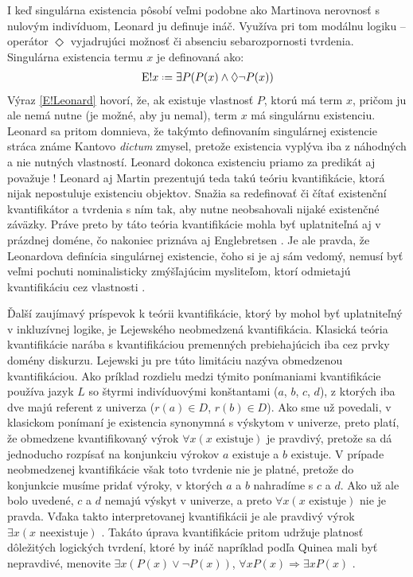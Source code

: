 \documentclass[12pt, letterpaper]{article}
\newcommand*{\defeq}{\mathrel{\vcenter{\baselineskip0.5ex \lineskiplimit0pt
                     \hbox{\scriptsize.}\hbox{\scriptsize.}}}%
                     =}
\begin{document}
I keď singulárna existencia pôsobí veľmi podobne ako Martinova nerovnosť s nulovým indivíduom, Leonard ju definuje ináč. Využíva pri tom modálnu logiku -- operátor $\Diamond$ vyjadrujúci možnosť či absenciu sebarozpornosti tvrdenia. Singulárna existencia termu $x$ je definovaná ako:
\begin{alignat}{3}
		\text{E}!x \defeq \exists P (P(x) \land \Diamond \neg P(x)) \label{E!Leonard}
\end{alignat}	
Výraz \ref{E!Leonard} hovorí, že, ak existuje vlastnosť $P$, ktorú má term $x$, pričom ju ale nemá nutne (je možné, aby ju nemal), term $x$ má singulárnu existenciu. Leonard sa pritom domnieva, že takýmto definovaním singulárnej existencie stráca známe Kantovo \textit{dictum}  zmysel, pretože existencia vyplýva iba z náhodných a nie nutných vlastností. Leonard dokonca existenciu priamo za predikát aj považuje \parencites[58]{leonard}! Leonard aj Martin prezentujú teda takú teóriu kvantifikácie, ktorá nijak nepostuluje existenciu objektov. Snažia sa redefinovať či čítať existenční kvantifikátor a tvrdenia s ním tak, aby nutne neobsahovali nijaké existenčné záväzky. Práve preto by táto teória kvantifikácie mohla byť uplatniteľná aj v prázdnej doméne, čo nakoniec priznáva aj Englebretsen \parencites[352]{englebretsen}. Je ale pravda, že Leonardova definícia singulárnej existencie, čoho si je aj sám vedomý, nemusí byť veľmi pochuti nominalisticky zmýšľajúcim mysliteľom, ktorí odmietajú kvantifikáciu cez vlastnosti \parencites[56]{leonard}.\par 
Ďalší zaujímavý príspevok k teórii kvantifikácie, ktorý by mohol byť uplatniteľný v inkluzívnej logike, je Lejewského neobmedzená kvantifikácia. Klasická teória kvantifikácie narába s kvantifikáciou premenných prebiehajúcich iba cez prvky domény diskurzu. Lejewski ju pre túto limitáciu nazýva obmedzenou kvantifikáciou. Ako príklad rozdielu medzi týmito ponímaniami kvantifikácie používa jazyk $L$ so štyrmi indivíduovými konštantami ($a$, $b$, $c$, $d$), z ktorých iba dve majú referent z univerza ($r(a) \in D$, $r(b) \in D$). Ako sme už povedali, v klasickom ponímaní je existencia synonymná s výskytom v univerze, preto platí, že obmedzene kvantifikovaný výrok $\forall x (x \text{ existuje})$ je pravdivý, pretože sa dá jednoducho rozpísať na konjunkciu výrokov $a \text{ existuje}$ a $b \text{ existuje}$. V prípade neobmedzenej kvantifikácie však toto tvrdenie nie je platné, pretože do konjunkcie musíme pridať výroky, v ktorých $a$ a $b$ nahradíme s $c$ a $d$. Ako už ale bolo uvedené, $c$ a $d$ nemajú výskyt v univerze, a preto $\forall x (x \text{ existuje})$ nie je pravda. Vďaka takto interpretovanej kvantifikácii je ale pravdivý výrok $\exists x (x \text{ neexistuje})$ \parencites[108--110]{lejewski}. Takáto úprava kvantifikácie pritom udržuje platnosť dôležitých logických tvrdení, ktoré by ináč napríklad podľa Quinea mali byť nepravdivé, menovite $\exists x (P(x) \lor \neg P(x))$, $\forall x P(x) \Rightarrow \exists x P(x)$ \parencites[352]{englebretsen}[112]{lejewski}.\par
\end{document}
